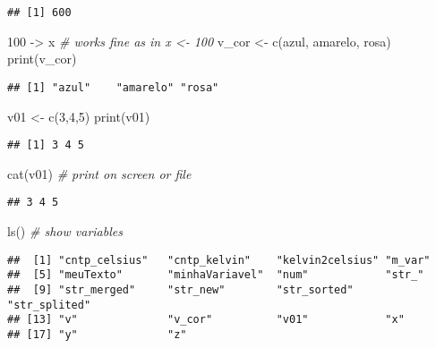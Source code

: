 \documentclass[
]{article}
\newenvironment{Shaded}{\begin{snugshade}}{\end{snugshade}}
\newcommand{\CommentTok}[1]{\textcolor[rgb]{0.56,0.35,0.01}{\textit{#1}}}
\newcommand{\DecValTok}[1]{\textcolor[rgb]{0.00,0.00,0.81}{#1}}
\newcommand{\FunctionTok}[1]{\textcolor[rgb]{0.00,0.00,0.00}{#1}}
\newcommand{\NormalTok}[1]{#1}
\newcommand{\OtherTok}[1]{\textcolor[rgb]{0.56,0.35,0.01}{#1}}
\newcommand{\StringTok}[1]{\textcolor[rgb]{0.31,0.60,0.02}{#1}}
\begin{document}
\begin{verbatim}
## [1] 600
\end{verbatim}

\begin{Shaded}
\begin{Highlighting}[]
\DecValTok{100} \OtherTok{{-}\textgreater{}}\NormalTok{ x }\CommentTok{\# works fine as in x \textless{}{-} 100}
\NormalTok{v\_cor }\OtherTok{\textless{}{-}} \FunctionTok{c}\NormalTok{(}\StringTok{\textquotesingle{}azul\textquotesingle{}}\NormalTok{, }\StringTok{\textquotesingle{}amarelo\textquotesingle{}}\NormalTok{, }\StringTok{\textquotesingle{}rosa\textquotesingle{}}\NormalTok{)}
\FunctionTok{print}\NormalTok{(v\_cor)}
\end{Highlighting}
\end{Shaded}

\begin{verbatim}
## [1] "azul"    "amarelo" "rosa"
\end{verbatim}

\begin{Shaded}
\begin{Highlighting}[]
\NormalTok{v01 }\OtherTok{\textless{}{-}} \FunctionTok{c}\NormalTok{(}\DecValTok{3}\NormalTok{,}\DecValTok{4}\NormalTok{,}\DecValTok{5}\NormalTok{)}
\FunctionTok{print}\NormalTok{(v01)}
\end{Highlighting}
\end{Shaded}

\begin{verbatim}
## [1] 3 4 5
\end{verbatim}

\begin{Shaded}
\begin{Highlighting}[]
\FunctionTok{cat}\NormalTok{(v01) }\CommentTok{\# print on screen or file}
\end{Highlighting}
\end{Shaded}

\begin{verbatim}
## 3 4 5
\end{verbatim}

\begin{Shaded}
\begin{Highlighting}[]
\FunctionTok{ls}\NormalTok{() }\CommentTok{\# show variables}
\end{Highlighting}
\end{Shaded}

\begin{verbatim}
##  [1] "cntp_celsius"   "cntp_kelvin"    "kelvin2celsius" "m_var"         
##  [5] "meuTexto"       "minhaVariavel"  "num"            "str_"          
##  [9] "str_merged"     "str_new"        "str_sorted"     "str_splited"   
## [13] "v"              "v_cor"          "v01"            "x"             
## [17] "y"              "z"
\end{verbatim}
\end{document}
